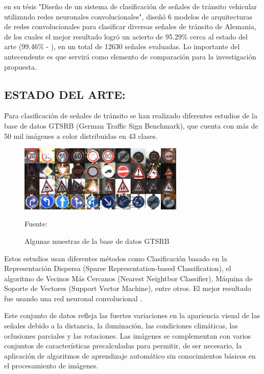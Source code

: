 		\citep{Ayuque2016} en su tésis "Diseño de un sistema de clasificación de señales de tránsito vehicular utilizando redes neuronales convolucionales", diseñó 6 modelos de arquitecturas de redes convolucionales para clasificar diversas señales de tránsito de Alemania, de los cuales el mejor resultado logró un acierto de 95.29\% cerca al estado del arte (99.46\% - \citep{Ciresan}), en un total de 12630 señales evaluadas. Lo importante del antecendente es que servirá como elemento de comparación para la investigación propuesta. 
		
	\subsection
	{ESTADO DEL ARTE:}

		Para clasificación de señales de tránsito se han realizado diferentes estudios de la base de datos GTSRB (German Traffic Sign Benchmark), que cuenta con más de 50 mil imágenes a color distribuidas en 43 clases.

		\begin{figure}[H]
		\begin{center}
		\includegraphics[width=0.7\textwidth]{images/intro/GTSRB}
		\end{center}
		\begin{center}
		\caption{\small{Algunas muestras de la base de datos GTSRB }}
		{\small{Fuente: \cite{Stallkamp2012}}}
		\end{center}
		\vspace{-1.5em}
		\end{figure}
		Estos estudios usan diferentes métodos como Clasificación basado en la Representación Dispersa (Sparse Representation-based Classification), el algoritmo de Vecinos Más Cercanos (Nearest Neightbor Classifier), Máquina de Soporte de Vectores (Support Vector Machine), entre otros. El mejor resultado fue usando una red neuronal convolucional \citep{Ciresan}.
		
		\vskip 0.4cm
		Este conjunto de datos refleja las fuertes variaciones en la apariencia visual de las señales debido a la distancia, la iluminación, las condiciones climáticas, las oclusiones parciales y las rotaciones. Las imágenes se complementan con varios conjuntos de características precalculadas para permitir, de ser necesario, la aplicación de algoritmos de aprendizaje automático sin conocimientos básicos en el procesamiento de imágenes.
		\vskip 0.4cm

